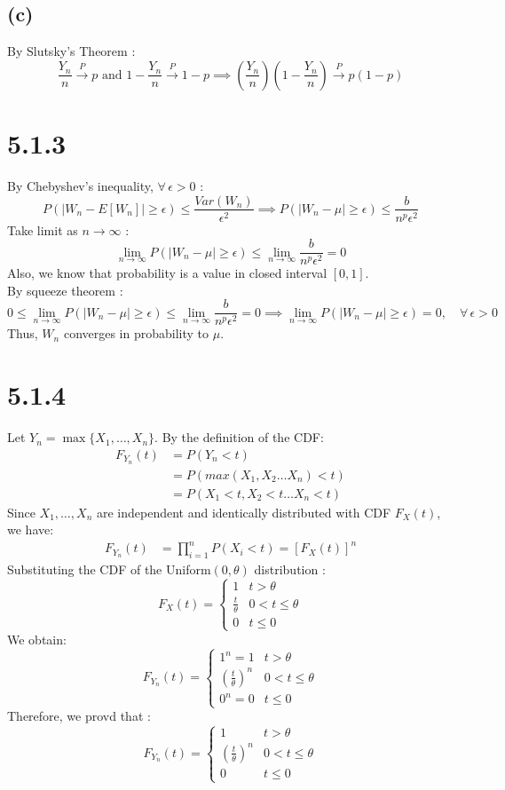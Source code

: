 \documentclass{article}
\begin{document}
\subsection*{(c)}
By Slutsky's Theorem :
\[
\frac{Y_n}{n} \xrightarrow{P} p \text{ and }
1-\frac{Y_n}{n} \xrightarrow{P} 1-p \implies 
\left(\frac{Y_n}{n}\right)\left(1-\frac{Y_n}{n}\right) \xrightarrow{P}
p(1-p)
\]
\section*{5.1.3}
By Chebyshev's inequality, $\forall \, \epsilon > 0$ :
\[
P\left(\left|W_n - E\left[ W_n \right]\right|\ge\epsilon\right) \le
\frac{Var\left(W_n\right)}{\epsilon^2} \implies
P\left(\left|W_n - \mu\right|\ge\epsilon\right)\le\frac{b}{n^p \epsilon^2}
\]
Take limit as $n \to \infty$ :
\[
    \lim_{n \rightarrow \infty}P\left(\left|W_n - \mu\right|\ge\epsilon\right)\le
    \lim_{n \rightarrow \infty}\frac{b}{n^p \epsilon^2} = 0
\]
Also, we know that probability is a value in closed interval $[0,1]$.\\
By squeeze theorem :
\[
0 \le
\lim_{n \rightarrow \infty}P\left(\left|W_n - \mu\right|\ge\epsilon\right)\le
\lim_{n \rightarrow \infty}\frac{b}{n^p \epsilon^2} = 0 \implies
\lim_{n \rightarrow \infty}P\left(\left|W_n - \mu\right|\ge\epsilon\right) = 0,
\quad \forall \, \epsilon > 0
\]
Thus, $W_n$ converges in probability to $\mu$.
\section*{5.1.4}
Let $Y_n = \max\{X_1, \dots, X_n\}$. By the definition of the CDF:
\begin{align*}
F_{Y_n}(t) &= P(Y_n < t)\\
&= P\left(max(X_1,X_2 \dots X_n) < t\right)\\
&= P\left(X_1 < t, X_2 < t \dots X_n < t\right)
\end{align*}
Since $X_1, \dots, X_n$ are independent and identically distributed with CDF $F_X(t)$, 
we have:
\begin{align*}
F_{Y_n}(t) &= \prod_{i=1}^{n} P\left(X_i < t\right) =  [F_X(t)]^n
\end{align*}
Substituting the CDF of the Uniform$(0, \theta)$ distribution :
$$
F_X(t) = 
\begin{cases}
    1 & t > \theta \\
    \frac{t}{\theta} & 0 < t \le \theta \\
    0 & t \le 0
\end{cases}
$$
We obtain:
\[
F_{Y_n}(t) = 
\begin{cases}
    1^n = 1 & t > \theta\\
    \left(\frac{t}{\theta}\right)^n  & 0 < t \le \theta \\
    0^n = 0 & t \le 0
\end{cases}
\]
Therefore, we provd that :
\[
F_{Y_n}(t) = 
\begin{cases}
    1 & t > \theta\\
    \left(\frac{t}{\theta}\right)^n  & 0 < t \le \theta \\
    0 & t \le 0
\end{cases}
\]
\end{document}
